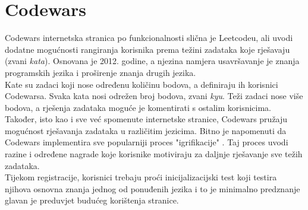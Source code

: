 \documentclass[times, utf8, zavrsni]{fer}
\begin{document}
	\section{Codewars}
	Codewars internetska stranica po funkcionalnosti slična je Leetcodeu, ali uvodi dodatne mogućnosti rangiranja korisnika prema težini zadataka koje rješavaju (zvani \textit{kata}). Osnovana je 2012. godine, a  njezina namjera usavršavanje je znanja programskih jezika i proširenje znanja drugih jezika.\\
	Kate su zadaci koji nose određenu količinu bodova, a definiraju ih korisnici Codewarsa. Svaka kata nosi odrežen broj bodova, zvani \textit{kyu}. Teži zadaci nose više bodova, a rješenja zadataka moguće je komentirati s ostalim korisnicima. Također, isto kao i sve već spomenute internetske stranice, Codewars pružaju mogućnost rješavanja zadataka u različitim jezicima. Bitno je napomenuti da Codewars implementira sve popularniji proces "igrifikacije" . Taj proces uvodi razine i određene nagrade koje korisnike motiviraju za daljnje rješavanje sve težih zadataka.\\
	Tijekom registracije, korisnici trebaju proći inicijalizacijski test koji testira njihova osnovna znanja jednog od ponuđenih jezika i to je minimalno predznanje glavan je preduvjet budućeg korištenja stranice.
	
\end{document}
